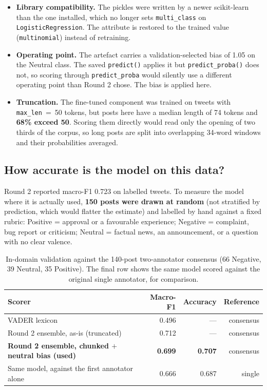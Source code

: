 \documentclass[11pt,a4paper]{article}
\begin{document}
\begin{itemize}[leftmargin=*]
  \item \textbf{Library compatibility.} The pickles were written by a newer scikit-learn than the one installed, which no longer sets \texttt{multi\_class} on \texttt{LogisticRegression}. The attribute is restored to the trained value (\texttt{multinomial}) instead of retraining.
  \item \textbf{Operating point.} The artefact carries a validation-selected bias of 1.05 on the Neutral class. The saved \texttt{predict()} applies it but \texttt{predict\_proba()} does not, so scoring through \texttt{predict\_proba} would silently use a different operating point than Round 2 chose. The bias is applied here.
  \item \textbf{Truncation.} The fine-tuned component was trained on tweets with \texttt{max\_len}~=~50 tokens, but posts here have a median length of 74 tokens and \textbf{68\% exceed 50}. Scoring them directly would read only the opening of two thirds of the corpus, so long posts are split into overlapping 34-word windows and their probabilities averaged.
\end{itemize}

\subsection{How accurate is the model on this data?}

Round 2 reported macro-F1 0.723 on labelled tweets. To measure the model where it is actually used, \textbf{150 posts were drawn at random} (not stratified by prediction, which would flatter the estimate) and labelled by hand against a fixed rubric: Positive = approval or a favourable experience; Negative = complaint, bug report or criticism; Neutral = factual news, an announcement, or a question with no clear valence.

\begin{table}[H]
\centering\small
\begin{tabular}{@{}lrrr@{}}
\toprule
\textbf{Scorer} & \textbf{Macro-F1} & \textbf{Accuracy} & \textbf{Reference} \\
\midrule
VADER lexicon & 0.496 & --- & consensus \\
Round 2 ensemble, as-is (truncated) & 0.712 & --- & consensus \\
\textbf{Round 2 ensemble, chunked $+$ neutral bias (used)} & \textbf{0.699} & \textbf{0.707} & consensus \\
\addlinespace
Same model, against the first annotator alone & 0.666 & 0.687 & single \\
\bottomrule
\end{tabular}
\caption{In-domain validation against the 140-post two-annotator consensus (66 Negative, 39 Neutral, 35 Positive). The final row shows the same model scored against the original single annotator, for comparison.}
\end{table}
\end{document}
